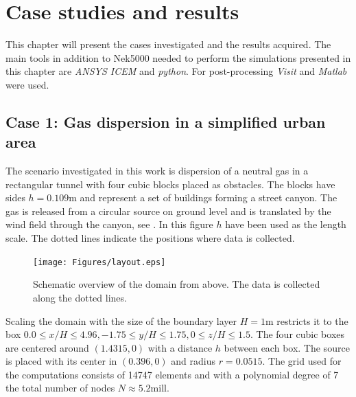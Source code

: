 
\chapter{Case studies and results} %

\label{results} %



This chapter will present the cases investigated and the results acquired.
The main tools in addition to Nek5000 needed to perform the simulations presented in this 
chapter are \textit{ANSYS ICEM} and \textit{python}. For post-processing \textit{Visit} and
\textit{Matlab} were used.
%
\section{Case 1: Gas dispersion in a simplified urban area}
The scenario investigated in this work is dispersion of a neutral gas in a rectangular tunnel
with four cubic blocks placed as obstacles. The blocks have sides $h = 0.109$m and represent a 
set of buildings forming a street canyon. The gas is released from a circular source on 
ground level and
is translated by the wind field through the canyon, see .
In this figure $h$ have been used as the length scale. The dotted lines
indicate the positions where data is collected.
%
\begin{figure}[h]
	\texttt{[image: Figures/layout.eps]}
	\caption{Schematic overview of the domain from above. The data is collected along the dotted lines.}
	\label{fig:layout}
\end{figure}
%

Scaling the domain with the size of the boundary layer $H =1$m restricts it to
the box $0.0\leq x/H \leq 4.96,-1.75\leq y/H \leq 1.75, 0\leq z/H \leq 1.5$.
The four cubic boxes are centered around $(1.4315,0)$ with a distance $h$ between each box.
The source is placed with its center in $(0.396,0)$ and radius $r = 0.0515$.
The grid used for the computations consists of 14747 elements and with a polynomial degree of
7 the total number of nodes $N\approx 5.2$mill. 


